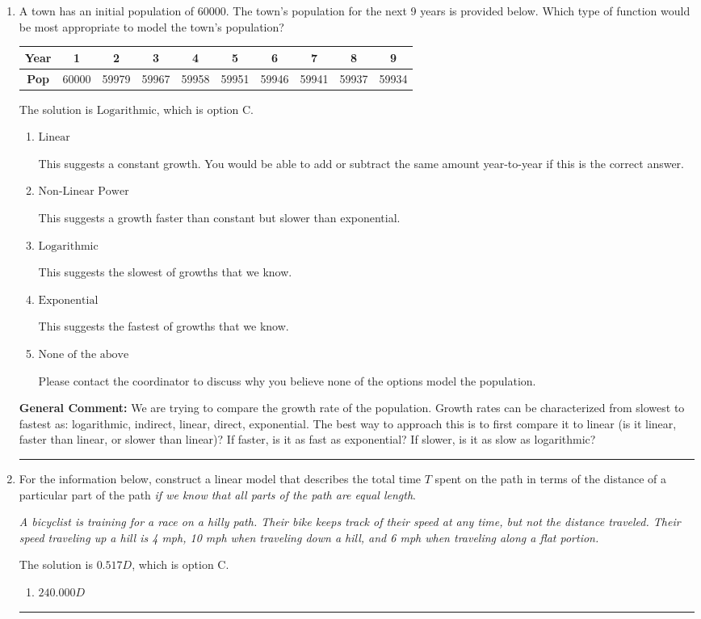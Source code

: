 \documentclass{extbook}[14pt]
\newcommand{\litem}[1]{\item #1

\rule{\textwidth}{0.4pt}}
\begin{document}
\begin{enumerate}\litem{
A town has an initial population of 60000. The town's population for the next 9 years is provided below. Which type of function would be most appropriate to model the town's population?


\begin{tabular}{c|c|c|c|c|c|c|c|c|c}
\textbf{Year} &1 &2 &3 &4 &5 &6 &7 &8 &9\tabularnewline \hline
\textbf{Pop} &60000 &59979 &59967 &59958 &59951 &59946 &59941 &59937 &59934\end{tabular}The solution is \( \text{Logarithmic} \), which is option C.\begin{enumerate}[label=\Alph*.]
\item \( \text{Linear} \)

This suggests a constant growth. You would be able to add or subtract the same amount year-to-year if this is the correct answer.
\item \( \text{Non-Linear Power} \)

This suggests a growth faster than constant but slower than exponential.
\item \( \text{Logarithmic} \)

This suggests the slowest of growths that we know.
\item \( \text{Exponential} \)

This suggests the fastest of growths that we know.
\item \( \text{None of the above} \)

Please contact the coordinator to discuss why you believe none of the options model the population.
\end{enumerate}

\textbf{General Comment:} We are trying to compare the growth rate of the population. Growth rates can be characterized from slowest to fastest as: logarithmic, indirect, linear, direct, exponential. The best way to approach this is to first compare it to linear (is it linear, faster than linear, or slower than linear)? If faster, is it as fast as exponential? If slower, is it as slow as logarithmic?
}
\litem{
For the information below, construct a linear model that describes the total time $T$ spent on the path in terms of the distance of a particular part of the path \textit{if we know that all parts of the path are equal length}.

\begin{center}
    \textit{ A bicyclist is training for a race on a hilly path. Their bike keeps track of their speed at any time, but not the distance traveled. Their speed traveling up a hill is 4 mph, 10 mph when traveling down a hill, and 6 mph when traveling along a flat portion. }
\end{center}
The solution is \( 0.517 D \), which is option C.\begin{enumerate}[label=\Alph*.]
\item \( 240.000 D \)


\end{enumerate}}
\end{enumerate}
\end{document}
